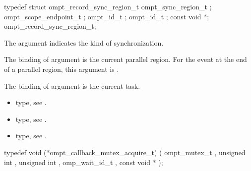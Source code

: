 \record

\begin{ccppspecific}
\begin{omptRecord}
typedef struct ompt_record_sync_region_t {
  ompt_sync_region_t ;
  ompt_scope_endpoint_t ;
  ompt_id_t ;
  ompt_id_t ;
  const void *;
} ompt_record_sync_region_t;
\end{omptRecord}
\end{ccppspecific}



\argdesc

The argument  indicates the kind of 
synchronization.

\epdesc

The binding of argument  is the current
parallel region.
For the  event at the end of a parallel region,
this argument is .

The binding of argument  is the current task.

\codeptrdesc

\crossreferences
\begin{itemize}
\item {} type, see
.
\item {} type, see
.
\item {} type, see
.
\end{itemize}


\label{sec:ompt_callback_mutex_acquire_t}
\format

\begin{ccppspecific}
\begin{omptCallback}
typedef void (*ompt_callback_mutex_acquire_t) (
  ompt_mutex_t ,
  unsigned int ,
  unsigned int ,
  omp_wait_id_t ,
  const void *
);
\end{omptCallback}
\end{ccppspecific}


